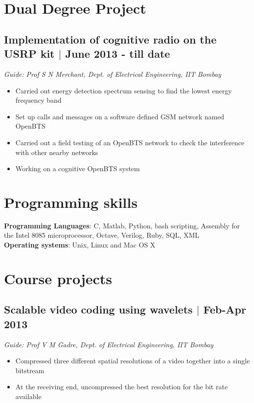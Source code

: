 \documentclass[12pt]{article}
\begin{document}
\setlength{\parindent}{0pt}
 


\vspace*{7\baselineskip}

\section*{Dual Degree Project}

\subsection*{Implementation of cognitive radio on the USRP kit $\vert$  June 2013 - till date}
\emph{Guide: Prof S N Merchant, Dept. of Electrical Engineering, IIT Bombay} 
\begin{itemize}
\item Carried out energy detection spectrum sensing to find the lowest energy frequency band   
\item Set up calls and messages on a software defined GSM network named OpenBTS 
\item Carried out a field testing of an OpenBTS network to check the interference with other nearby networks 
\item Working on a cognitive OpenBTS system 
\end{itemize}

\section*{Programming skills}
\textbf{Programming Languages}: C, Matlab, Python, bash scripting, Assembly for the Intel 8085 microprocessor, Octave, Verilog, Ruby, SQL, XML  \\
\textbf{Operating systems}: Unix, Linux and Mac OS X


\section*{Course projects}
\subsection*{Scalable video coding using wavelets $\vert$  Feb-Apr 2013}
\emph{Guide: Prof V M Gadre, Dept. of Electrical Engineering, IIT Bombay} 
\begin{itemize} 
\item Compressed three different spatial resolutions of a video together into a single bitstream  
\item At the receiving end, uncompressed the best resolution for the bit rate available 
\end{itemize}
\end{document}
